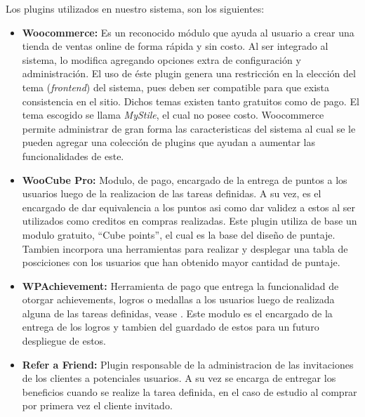 Los plugins utilizados en nuestro sistema, son los siguientes:

\begin{itemize}

    \item {\bf Woocommerce:}
        Es un reconocido módulo que ayuda al usuario a crear una tienda de
        ventas online de forma rápida y sin costo.
        Al ser integrado al sistema, lo modifica agregando opciones
        extra de configuración y administración.
        El uso de éste plugin genera una restricción en la elección
        del tema (\emph{frontend}) del sistema, pues deben ser compatible
        para que exista consistencia en el sitio.
        Dichos temas existen tanto gratuitos como de pago.
        El tema escogido se llama \emph{MyStile}, el cual no posee costo.
        Woocommerce permite administrar de gran forma las caracteristicas del
        sistema al cual se le pueden agregar una colección de plugins que ayudan a 
	aumentar las funcionalidades de este.

    \item {\bf WooCube Pro:}
	Modulo, de pago, encargado de la entrega de puntos a los usuarios luego de la
	realizacion de las tareas definidas. A su vez, es el encargado de dar equivalencia
	a los puntos asi como dar validez a estos al ser utilizados como creditos 
	en compras realizadas. Este plugin utiliza de base un modulo gratuito, ``Cube points'',
	el cual es la base del diseño de puntaje. Tambien incorpora una herramientas
	para realizar y desplegar una tabla de posciciones con los usuarios que han
	obtenido mayor cantidad de puntaje. 

    \item {\bf WPAchievement:}
	Herramienta de pago que entrega la funcionalidad de otorgar achievements, logros o medallas
	a los usuarios luego de realizada alguna de las tareas definidas, vease .
	Este modulo es el encargado de la entrega de los logros y tambien del guardado de estos 
	para un futuro despliegue de estos.

    \item {\bf Refer a Friend:}
        Plugin responsable de la administracion de las invitaciones de los clientes a
	potenciales usuarios. A su vez se encarga de entregar los beneficios cuando se 
	realize la tarea definida, en el caso de estudio al comprar por primera vez el cliente invitado.

\end{itemize}
